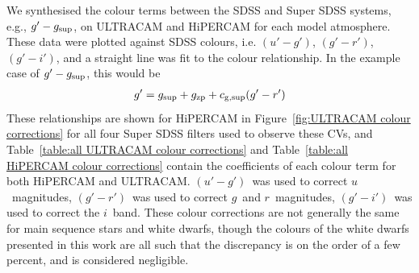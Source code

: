 We synthesised the colour terms between the SDSS and Super SDSS systems, e.g., $g'-g_{\rm sup}$, on ULTRACAM and HiPERCAM for each model atmosphere. These data were plotted against SDSS colours, i.e. $(u'-g')$, $(g'-r')$, $(g'-i')$, and a straight line was fit to the colour relationship. In the example case of $g'-g_{\rm sup}$, this would be
\begin{align*}
    g' &= g_{\rm sup} + g_{\rm zp} + c_{\rm g, sup}(g'-r') \\
\end{align*}
These relationships are shown for HiPERCAM in Figure~\ref{fig:ULTRACAM colour corrections} for all four Super SDSS filters used to observe these CVs, and Table~\ref{table:all ULTRACAM colour corrections} and Table~\ref{table:all HiPERCAM colour corrections} contain the coefficients of each colour term for both HiPERCAM and ULTRACAM.
$(u'-g')$\ was used to correct $u$\ magnitudes, $(g'-r')$\ was used to correct $g$\ and $r$\ magnitudes, $(g'-i')$\ was used to correct the $i$\ band.
These colour corrections are not generally the same for main sequence stars and white dwarfs, though the colours of the white dwarfs presented in this work are all such that the discrepancy is on the order of a few percent, and is considered negligible.

